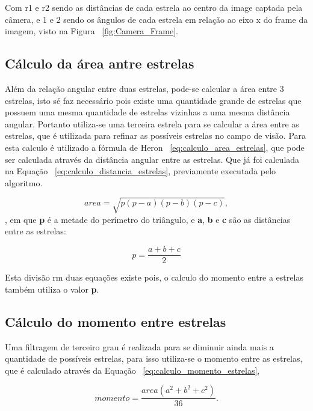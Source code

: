 Com r\small{1} e r\small{2} sendo as distâncias de cada estrela ao centro da image captada pela câmera, 
e \texttheta\small{1} e \texttheta\small{2} sendo os ângulos de cada estrela em relação ao eixo x do frame da imagem, visto na Figura ~\ref{fig:Camera_Frame}.

\subsection{Cálculo da área antre estrelas}

Além da relação angular entre duas estrelas, pode-se calcular a área entre 3 estrelas, 
isto sé faz necessário pois existe uma quantidade grande de estrelas que possuem uma mesma quantidade de estrelas vizinhas a uma mesma distância angular.
Portanto utiliza-se uma terceira estrela para se calcular a área entre as estrelas, que é utilizada para refinar as possíveis estrelas no campo de visão.
Para esta calculo é utilizado a fórmula de Heron ~\ref{eq:calculo_area_estrelas}, que pode ser calculada através da distância angular entre as estrelas.
Que já foi calculada na Equação ~\ref{eq:calculo_distancia_estrelas}, previamente executada pelo algoritmo.

\begin{equation}
	area = \sqrt{p(p-a)(p-b)(p-c)},
	\label{eq:calculo_area_estrelas}
\end{equation},
em que \textbf{p} é a metade do perímetro do triângulo, e \textbf{a}, \textbf{b} e \textbf{c} são as distâncias entre as estrelas:

\begin{equation}
	p = \frac{a+b+c}{2}
	\label{eq:calculo_area_estrelas_p}
\end{equation}

Esta divisão rm duas equações existe pois, 
o calculo do momento entre a estrelas também utiliza o valor \textbf{p}.

\subsection{Cálculo do momento entre estrelas}

Uma filtragem de terceiro grau é realizada para se diminuir ainda mais a quantidade de possíveis estrelas, 
para isso utiliza-se o momento entre as estrelas, que é calculado através da Equação ~\ref{eq:calculo_momento_estrelas},

\begin{equation}
	momento = \frac{area (a^2 + b^2 + c^2)}{36}.
	\label{eq:calculo_momento_estrelas}
\end{equation}


